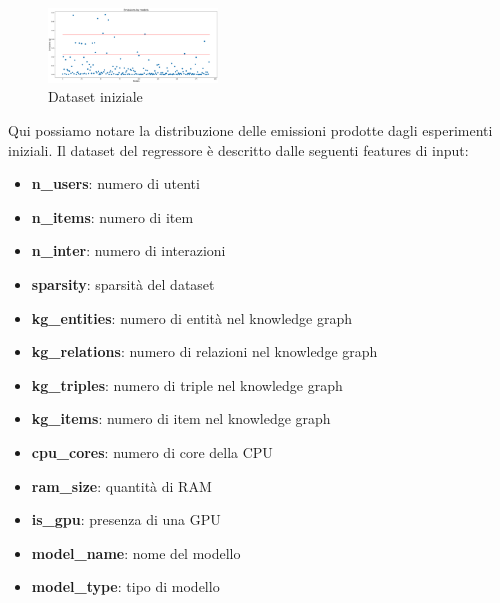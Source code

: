 \begin{frame}{}
    \begin{figure}
        \centering
        \includegraphics[width=0.4\textwidth]{images/situazione-attuale.png}
        \caption{Dataset iniziale}
    \end{figure}
    
    Qui possiamo notare la distribuzione delle emissioni prodotte dagli esperimenti iniziali.
    Il dataset del regressore è descritto dalle seguenti features di input:
    \begin{itemize}
        \small
        \item \textbf{n\_users}: numero di utenti
        \item \textbf{n\_items}: numero di item
        \item \textbf{n\_inter}: numero di interazioni
        \item \textbf{sparsity}: sparsità del dataset
        \item \textbf{kg\_entities}: numero di entità nel knowledge graph
        \item \textbf{kg\_relations}: numero di relazioni nel knowledge graph
        \item \textbf{kg\_triples}: numero di triple nel knowledge graph
        \item \textbf{kg\_items}: numero di item nel knowledge graph
        \item \textbf{cpu\_cores}: numero di core della CPU
        \item \textbf{ram\_size}: quantità di RAM
        \item \textbf{is\_gpu}: presenza di una GPU
        \item \textbf{model\_name}: nome del modello
        \item \textbf{model\_type}: tipo di modello
    \end{itemize}
\end{frame}

